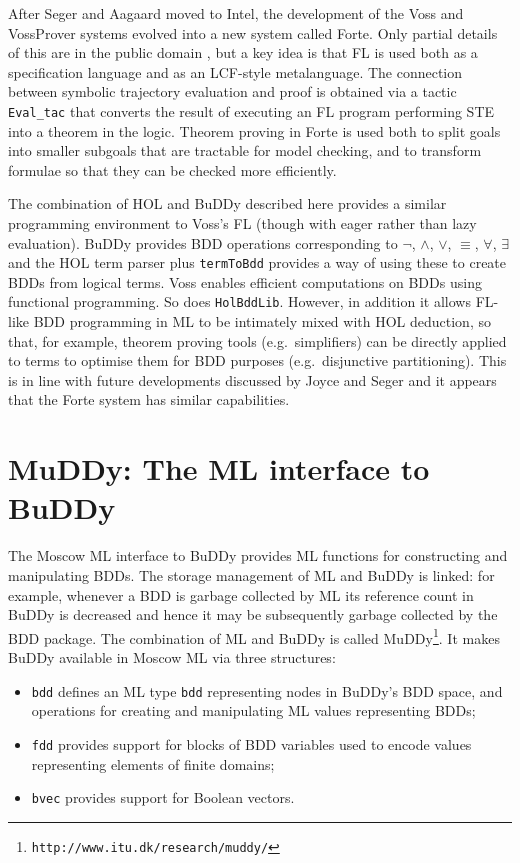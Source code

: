 \documentclass[12pt]{article}
\renewcommand{\t}[1]{\mbox{\tt #1}}
\newcommand{\ml}[1]{{\tt #1}}
\newcommand\HOL{HOL\xspace}
\newcommand{\Buddy}{BuDDy\xspace}
\newcommand{\Muddy}{MuDDy\xspace}
\begin{document}
After Seger and Aagaard moved to Intel, the development of the Voss and
VossProver systems evolved into a new system called Forte.  Only partial details
of this are in the public domain
\cite{oleary-itj-99,aagaard-tphols-99}, but a key idea is that FL is
used both as a specification language and as an LCF-style
metalanguage. The connection between symbolic trajectory evaluation
and proof is obtained via a tactic {\tt{Eval\_tac}} that converts the
result of executing an FL program performing STE into a theorem in the
logic. Theorem proving in Forte is used both to split goals into
smaller subgoals that are tractable for model checking, and to
transform formulae so that they can be checked more efficiently.

The combination of \HOL{} and \Buddy{} described here provides a similar
programming environment to Voss's FL (though with eager rather than
lazy evaluation). \Buddy{} provides BDD operations corresponding to
$\neg$, $\wedge$, $\vee$, $\equiv$, $\forall$, $\exists$ and the \HOL{}
term parser plus \ml{termToBdd} provides a way of using these to
create BDDs from logical terms.  Voss enables efficient computations
on BDDs using functional programming. So does \ml{HolBddLib}. However, in
addition it allows FL-like BDD programming in ML to be intimately
mixed with \HOL{} deduction, so that, for example, theorem proving tools
(e.g.~simplifiers) can be directly applied to terms to optimise them
for BDD purposes (e.g.~disjunctive partitioning).  This is in line
with future developments discussed by Joyce and Seger
\cite{JoyceSeger} and it appears that the Forte system has similar
capabilities.


\newpage

\part{\Muddy: The ML interface to \Buddy}\label{muddy}

The Moscow ML interface to \Buddy{} provides ML functions for
constructing and manipulating BDDs.  The storage management of ML and
\Buddy{} is linked: for example, whenever a BDD is garbage collected by ML
its reference count in \Buddy{} is decreased and hence it may be subsequently
garbage collected by the BDD package. The combination of ML and \Buddy{}
is called \Muddy\footnote{\t{http://www.itu.dk/research/muddy/}}. It
makes \Buddy{} available in Moscow ML via
three structures:

\begin{itemize}

\item \t{bdd} defines an ML type
\t{bdd} representing nodes in \Buddy's BDD space,
and operations for creating and manipulating ML values
representing BDDs;


\item \t{fdd} provides support for blocks of BDD variables
used to encode values representing elements of finite domains;

\item \t{bvec} provides support for Boolean vectors.

\end{itemize}
\end{document}
